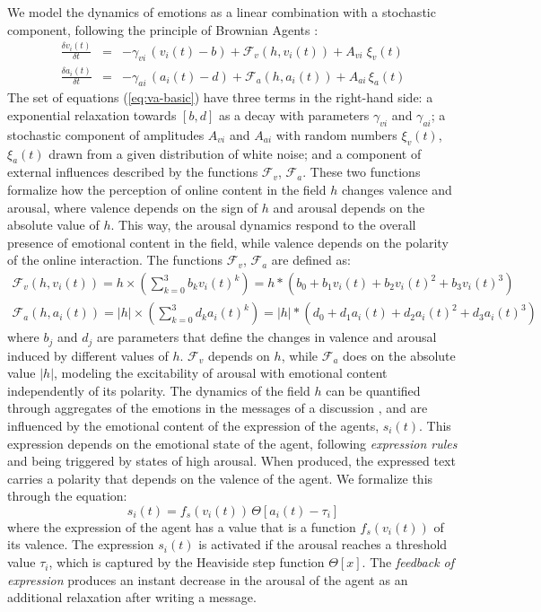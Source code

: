 \documentclass[nologo,url,11pt,a4paper]{ETHpaper}
\begin{document}
We model the dynamics of emotions as a linear combination with a stochastic component, following the principle of Brownian Agents \cite{Schweitzer2003}:
\begin{eqnarray}
  \frac{\delta v_i(t)}{\delta t} &=& - \gamma_{vi}\, (v_i(t) - b) + \mathcal{F}_v(h,v_i(t)) +
  A_{vi}\;\xi_v(t) \nonumber \\
  \frac{\delta a_i(t)}{\delta t} &=& - \gamma_{ai} \, (a_i(t) - d) + \mathcal{F}_a(h,a_i(t)) + 
  A_{ai}\,\xi_a(t)
  \label{eq:va-basic}
\end{eqnarray}
The set of equations (\ref{eq:va-basic}) have three terms in the right-hand side: a exponential relaxation towards $[b, d]$  as a decay with parameters $\gamma_{vi}$ and $\gamma_{ai}$; a stochastic component  of amplitudes $A_{vi}$ and $ A_{ai}$  with random numbers $\xi_{v}(t)$, $\xi_{a}(t)$ drawn from a given distribution of white noise; and a component of external influences described by the functions $\mathcal{F}_v$, $\mathcal{F}_a$. 
These two functions formalize how the perception of online content in the field $h$ changes valence and arousal, where valence depends on the sign of $h$ and arousal depends on the absolute value of $h$. This way, the arousal dynamics respond to the overall presence of emotional content in the field, while valence depends on the polarity of the online interaction.
The functions $\mathcal{F}_v$, $\mathcal{F}_a$ are defined as:
\begin{eqnarray}
\mathcal{F}_v(h,v_i(t)) = h \times \left ( \sum_{k=0}^{3} b_k v_i(t)^k \right )= h * \left (b_0 + b_1 v_i(t) + b_2 v_i(t)^2  + b_3 v_i(t)^3 \right ) \nonumber \\
 \mathcal{F}_a(h,a_i(t)) =  |h| \times \left ( \sum_{k=0}^{3} d_k a_i(t)^k \right ) = |h| * \left( d_0 + d_1 a_i(t) + d_2 a_i(t)^2  + d_3 a_i(t)^3 \right ) 
  \label{eq:fva}
\end{eqnarray}
where $b_j$ and $d_j$ are parameters that define the changes in valence and arousal induced by different values of $h$. 
$\mathcal{F}_v$ depends on $h$, while $\mathcal{F}_a$ does on the absolute value $|h|$, modeling the excitability of arousal with emotional content independently of its polarity.
The dynamics of the field $h$ can be quantified through aggregates of the emotions in the messages of a discussion \cite{Garas2012,Garcia2011}, and are influenced by the emotional content of the expression of the agents, $s_i(t)$. 
This expression depends on the emotional state of the agent, following \emph{expression rules} and being triggered by states of high arousal. When produced, the expressed text carries a polarity that depends on the valence of the agent. We formalize this through the equation:
\begin{equation}
  \label{s-i}
  s_i(t) = f_s(v_i(t))\, \Theta[a_{i}(t) - \tau_i]
\end{equation}
where the expression of the agent has a value that is a function $f_s(v_i(t))$
of its valence. The expression $s_i(t)$ is activated  if the arousal reaches
a threshold value $\tau_i$, which is captured by the Heaviside step function
$\Theta[x]$.  The \emph{feedback of expression} produces an instant decrease in the arousal of the agent as an additional relaxation after writing a message.
\end{document}
